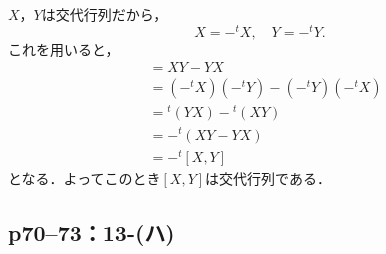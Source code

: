 \begin{tproof}
  $X$，$Y$は交代行列だから，
  \[
    X=- {}^t X ,\quad Y = -{}^t Y .
  \]
  これを用いると，
  \begin{align*}
    [X,Y] & = XY -YX                                   \\
          & = (-{}^t X) (-{}^t Y) - (-{}^t Y)(-{}^t X) \\
          & = {}^t (YX) - {}^t (XY)                    \\
          & = -{}^t (XY-YX)                            \\
          & = -{}^t [X,Y]
  \end{align*}
  となる．よってこのとき$[X,Y]$は交代行列である．
\end{tproof}



\subsection*{p70--73：13-(ハ)}

